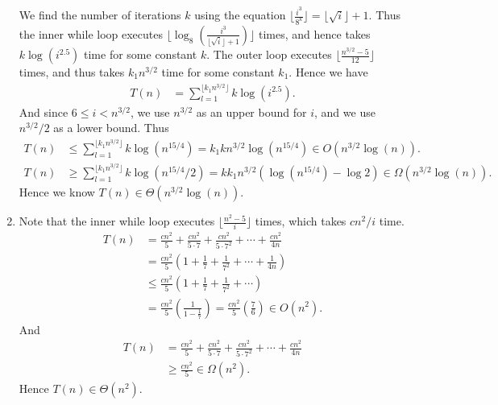 \documentclass[10pt,oneside,reqno]{amsart}
\theoremstyle{plain}
\theoremstyle{definition}
\begin{document}
\begin{enumerate}[label=\arabic*.]
We find the number of iterations $k$ using the equation $\lfloor\frac{i^3}{8^k}\rfloor = \lfloor \sqrt{i}\rfloor + 1$. Thus the inner while loop executes $\lfloor \log_8( \frac{i^3}{\lfloor \sqrt{i} \rfloor + 1} )\rfloor$ times, and hence takes $k\log(i^{2.5})$ time for some constant $k$. The outer loop executes $\lfloor \frac{n^{3/2} - 5}{12} \rfloor$ times, and thus takes $k_1n^{3/2}$ time for some constant $k_1$. Hence we have
\begin{equation}
\begin{aligned}
T(n) &= \sum_{l = 1}^{\lfloor k_1n^{3/2}\rfloor} k \log(i^{2.5}). 
\end{aligned}
\end{equation}
And since $6 \leq i < n^{3/2}$, we use $n^{3/2}$ as an upper bound for $i$, and we use $n^{3/2}/2$ as a lower bound. Thus
\begin{equation}
\begin{aligned}
T(n) &\leq \sum_{l = 1}^{\lfloor k_1n^{3/2}\rfloor} k \log(n^{15/4}) = k_1kn^{3/2}\log(n^{15/4}) \in O \left( n^{3/2}\log(n)\right). \\
T(n) &\geq  \sum_{l = 1}^{\lfloor k_1n^{3/2}\rfloor} k \log(n^{15/4}/2) = kk_1n^{3/2}(\log(n^{15/4}) - \log2) \in \Omega \left( n^{3/2}\log(n) \right). 
\end{aligned}
\end{equation}
Hence we know $T(n) \in \Theta \left( n^{3/2}\log(n) \right)$. \\

\item Note that the inner while loop executes $\lfloor \frac{n^2 - 5}{i} \rfloor$ times, which takes $cn^2/i$ time.  
\begin{equation}
\begin{aligned}
T(n) &=  \frac{cn^2}{5} + \frac{cn^2}{5 \cdot 7} + \frac{cn^2}{5 \cdot 7^2} + \cdots + \frac{cn^2}{4n}\\
&= \frac{cn^2}{5}\left(1 + \frac{1}{7} + \frac{1}{7^2} + \cdots + \frac{1}{4n} \right)\\
&\leq \frac{cn^2}{5}\left(1 + \frac{1}{7} + \frac{1}{7^2} + \cdots  \right)\\
&= \frac{cn^2}{5}\left(\frac{1}{1 - \frac{1}{7}} \right) = \frac{cn^2}{5}\left(\frac{7}{6} \right) \in O\left( n^2 \right). 
\end{aligned}
\end{equation}
And 
\begin{equation}
\begin{aligned}
T(n) &=  \frac{cn^2}{5} + \frac{cn^2}{5 \cdot 7} + \frac{cn^2}{5 \cdot 7^2} + \cdots + \frac{cn^2}{4n}\\
&\geq \frac{cn^2}{5}  \in \Omega(n^2). 
\end{aligned}
\end{equation}
Hence $T(n) \in \Theta(n^2)$. \\


\end{enumerate}
\end{document}
